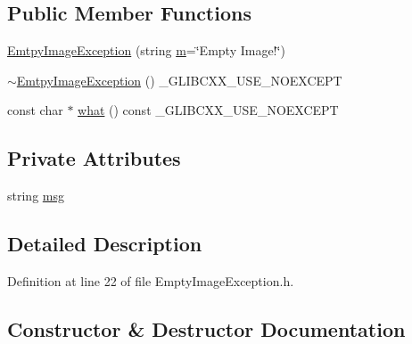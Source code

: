 \subsection*{Public Member Functions}
\begin{DoxyCompactItemize}
\item 
\hyperlink{class_vision_1_1_exception_1_1_emtpy_image_exception_ac5ffe210a9b0334c94b30960d4b4a3e8}{Emtpy\+Image\+Exception} (string \hyperlink{_gen_blob_8m_ab3cd915d758008bd19d0f2428fbb354a}{m}=\char`\"{}Empty Image!\char`\"{})
\item 
\hyperlink{class_vision_1_1_exception_1_1_emtpy_image_exception_a525fb499437fb7b2d8612118430549ec}{$\sim$\+Emtpy\+Image\+Exception} () \+\_\+\+G\+L\+I\+B\+C\+X\+X\+\_\+\+U\+S\+E\+\_\+\+N\+O\+E\+X\+C\+E\+P\+T
\item 
const char $\ast$ \hyperlink{class_vision_1_1_exception_1_1_emtpy_image_exception_a07ecf1da15bdf9d26b32ee9044b529f0}{what} () const \+\_\+\+G\+L\+I\+B\+C\+X\+X\+\_\+\+U\+S\+E\+\_\+\+N\+O\+E\+X\+C\+E\+P\+T
\end{DoxyCompactItemize}
\subsection*{Private Attributes}
\begin{DoxyCompactItemize}
\item 
string \hyperlink{class_vision_1_1_exception_1_1_emtpy_image_exception_a170fca455cf8c837ce36f26076d094c5}{msg}
\end{DoxyCompactItemize}


\subsection{Detailed Description}


Definition at line 22 of file Empty\+Image\+Exception.\+h.



\subsection{Constructor \& Destructor Documentation}
\hypertarget{class_vision_1_1_exception_1_1_emtpy_image_exception_ac5ffe210a9b0334c94b30960d4b4a3e8}{}
